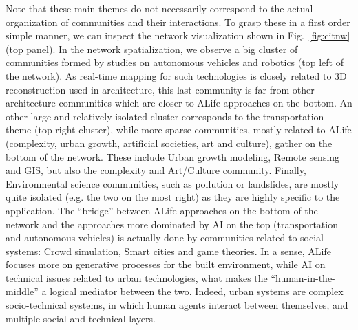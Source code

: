 \documentclass[letterpaper]{article}
\begin{document}
Note that these main themes do not necessarily correspond to the actual organization of communities and their interactions. To grasp these in a first order simple manner, we can inspect the network visualization shown in Fig.~\ref{fig:citnw} (top panel). In the network spatialization, we observe a big cluster of communities formed by studies on autonomous vehicles and robotics (top left of the network). As real-time mapping for such technologies is closely related to 3D reconstruction used in architecture, this last community is far from other architecture communities which are closer to ALife approaches on the bottom. An other large and relatively isolated cluster corresponds to the transportation theme (top right cluster), while more sparse communities, mostly related to ALife (complexity, urban growth, artificial societies, art and culture), gather on the bottom of the network. These include Urban growth modeling, Remote sensing and GIS, but also the complexity and Art/Culture community. Finally, Environmental science communities, such as pollution or landslides, are mostly quite isolated (e.g. the two on the most right) as they are highly specific to the application. The ``bridge'' between ALife approaches on the bottom of the network and the approaches more dominated by AI on the top (transportation and autonomous vehicles) is actually done by communities related to social systems: Crowd simulation, Smart cities and game theories. In a sense, ALife focuses more on generative processes for the built environment, while AI on technical issues related to urban technologies, what makes the ``human-in-the-middle'' a logical mediator between the two. Indeed, urban systems are complex socio-technical systems, in which human agents interact between themselves, and multiple social and technical layers.
\end{document}
